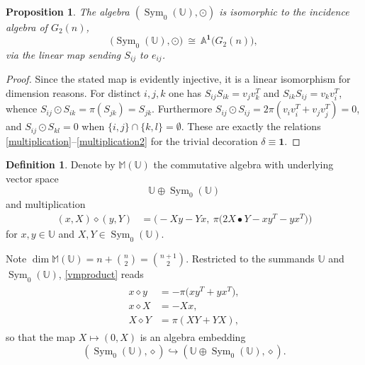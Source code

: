 \documentclass[times,11pt,reqno]{amsproc}
\newtheorem{proposition}[theorem]{Proposition}
\theoremstyle{definition}
\newtheorem{definition}[theorem]{Definition}
\numberwithin{equation}{section}
\def\alg{\mathbb{A}}
\def\ualg{\mathbb{U}}
\DeclareMathOperator{\Sym}{Sym}
\def\ualg{\mathbb{U}}
\def\malg{\mathbb{M}}
\newcommand{\vm}[1]{\malg(#1)}
\begin{document}
\begin{proposition}\label{prop:evenpart}
    The algebra $(\Sym_0(\ualg),\odot)$ is isomorphic to the incidence
    algebra of $G_2(n)$,
\begin{equation}\label{evenpart}
\bigl(\Sym_0(\ualg),\odot\bigr)
\ \cong\
\alg^{\mathbf 1}\bigl(G_2(n)\bigr),
\end{equation}
via the linear map sending $S_{ij}$ to $e_{ij}$.
\end{proposition}

\begin{proof}
Since the stated map is evidently injective, it is a linear isomorphism for dimension reasons.
For distinct $i,j,k$ one has
$S_{ij}S_{ik}=v_jv_k^{T}$ and $S_{ik}S_{ij}=v_kv_i^{T}$, whence
$S_{ij}\odot S_{ik}=\pi(S_{jk})=S_{jk}$. Furthermore
$S_{ij}\odot S_{ij}=2\pi(v_iv_i^{T}+v_jv_j^{T})=0$, and
$S_{ij}\odot S_{kl}=0$ when $\{i,j\}\cap\{k,l\}=\emptyset$. These are
exactly the relations \eqref{multiplication}--\eqref{multiplication2}
for the trivial decoration $\delta\equiv\mathbf 1$.
\end{proof}


    \begin{definition}\label{def:vm}
Denote by $\vm{\ualg}$  the commutative algebra
with underlying vector space
$$\ualg\oplus\Sym_0(\ualg)
$$ and multiplication
\begin{equation}\label{vmproduct}
\begin{aligned}
(x,X)\diamond(y,Y)&=
\bigl(-Xy-Yx,\
\pi\bigl(2X\bullet Y-xy^{T}-yx^{T}\bigr)\bigr)
\end{aligned}
\end{equation}
for $x, y \in \ualg$ and $X, Y \in \Sym_0(\ualg)$.
\end{definition}
Note $\dim\vm{\ualg}=n+\binom n2=\binom{n+1}{2}$.
Restricted to the summands $\ualg$ and $\Sym_0(\ualg)$, \eqref{vmproduct} reads
\begin{align}\label{vmsummands}
\begin{aligned}
x\diamond y&=-\pi\bigl(xy^{T}+yx^{T}\bigr),
\\
x\diamond X&=-Xx,
\\
X\diamond Y&=\pi(XY+YX),
\end{aligned}
\end{align}
so that the map
$X\longmapsto(0,X)$ is an algebra embedding
$$
(\Sym_0(\ualg),\diamond)
\hookrightarrow
(\ualg \oplus \Sym_0(\ualg), \diamond).
$$
\end{document}
